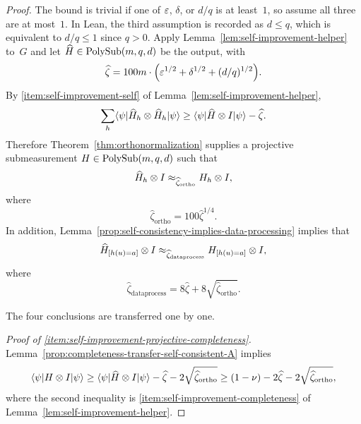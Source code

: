 \begin{proof}
  \leanok
  The bound is trivial if one of $\varepsilon$, $\delta$, or $d/q$ is at least~$1$, so assume all three are at most~$1$.  In Lean, the third assumption is recorded as $d \le q$, which is equivalent to $d/q \le 1$ since $q>0$. Apply Lemma~\ref{lem:self-improvement-helper} to~$G$ and let $\widehat H \in \mathrm{PolySub}(m,q,d)$ be the output, with
  \[
    \widehat{\zeta} = 100m \cdot \Big(\varepsilon^{1/2} + \delta^{1/2} + (d/q)^{1/2}\Big).
  \]
  By \ref{item:self-improvement-self} of Lemma~\ref{lem:self-improvement-helper},
  \[
    \sum_{h} \langle \psi \rvert \widehat{H}_h \otimes \widehat{H}_h \lvert \psi \rangle
    \geq \langle \psi \rvert \widehat{H} \otimes I \lvert \psi \rangle - \widehat{\zeta}.
  \]
  Therefore Theorem~\ref{thm:orthonormalization} supplies a projective submeasurement $H \in \mathrm{PolySub}(m,q,d)$ such that
  \begin{equation}\label{eq:approx-between-H-with-and-without-hat}
    \widehat{H}_h \otimes I \approx_{\widehat{\zeta}_{\mathrm{ortho}}} H_{h} \otimes I,
  \end{equation}
  where
  \[
    \widehat{\zeta}_{\mathrm{ortho}} = 100 \widehat{\zeta}^{1/4}.
  \]
  In addition, Lemma~\ref{prop:self-consistency-implies-data-processing} implies that
  \begin{equation}\label{eq:approx-data-processed}
    \widehat{H}_{[h(u)=a]} \otimes I \approx_{\widehat{\zeta}_{\mathrm{dataprocess}}} H_{[h(u)=a]} \otimes I,
  \end{equation}
  where
  \[
    \widehat{\zeta}_{\mathrm{dataprocess}} = 8 \widehat{\zeta} + 8 \sqrt{\widehat{\zeta}_{\mathrm{ortho}}}.
  \]

  The four conclusions are transferred one by one.

  \emph{Proof of \ref{item:self-improvement-projective-completeness}.}
  Lemma~\ref{prop:completeness-transfer-self-consistent-A} implies
  \[
    \langle \psi \rvert H \otimes I \lvert \psi \rangle
    \geq \langle \psi \rvert \widehat{H} \otimes I \lvert \psi \rangle - \widehat{\zeta} - 2\sqrt{\widehat{\zeta}_{\mathrm{ortho}}}
    \geq (1-\nu) - 2\widehat{\zeta} - 2\sqrt{\widehat{\zeta}_{\mathrm{ortho}}},
  \]
  where the second inequality is \ref{item:self-improvement-completeness} of Lemma~\ref{lem:self-improvement-helper}.


\end{proof}
